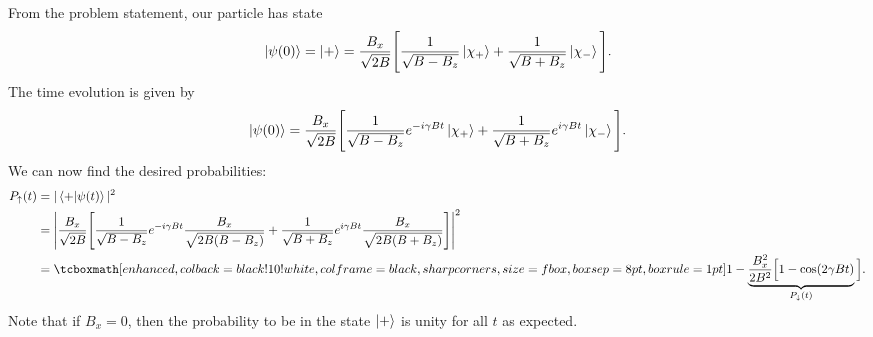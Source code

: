 {From the problem statement, our particle has state
\begin{align}
    \ket{\psi(0)} = \ket{+} = \frac{B_{x}}{\sqrt{2 B}} \Bigg[ \frac{1}{\sqrt{B - B_{z}}} \ket{\chi_{+}} + \frac{1}{\sqrt{B + B_{z}}} \ket{\chi_{-}} \Bigg]
.\end{align}
The time evolution is given by
\begin{align}
    \ket{\psi(0)} = \frac{B_{x}}{\sqrt{2 B}} \Bigg[ \frac{1}{\sqrt{B - B_{z}}} e^{- i \gamma B t} \ket{\chi_{+}} + \frac{1}{\sqrt{B + B_{z}}} e^{i \gamma B t} \ket{\chi_{-}} \Bigg]
.\end{align}
We can now find the desired probabilities:
\begin{align}
    P_{\uparrow}(t) &= |\ip{+}{\psi(t)}|^2 \nonumber \\
                    &= \Bigg| \frac{B_{x}}{\sqrt{2 B}} \Bigg[ \frac{1}{\sqrt{B - B_{z}}} e^{-i \gamma B t} \frac{B_{x}}{\sqrt{2B(B - B_{z})}} + \frac{1}{\sqrt{B + B_{z}}} e^{i \gamma B t} \frac{B_{x}}{\sqrt{2B(B + B_{z})}} \Bigg] \Bigg|^2 \nonumber \\
                    &= \eqbox{ 1 - \underbrace{ \frac{B_{x}^2}{2 B^2} \Big[ 1 - \cos(2 \gamma B t) }_{P_{\downarrow}(t)} \Big] }
.\end{align}
Note that if $B_{x} = 0$, then the probability to be in the state $\ket{+}$ is unity for all $t$ as expected.

}
